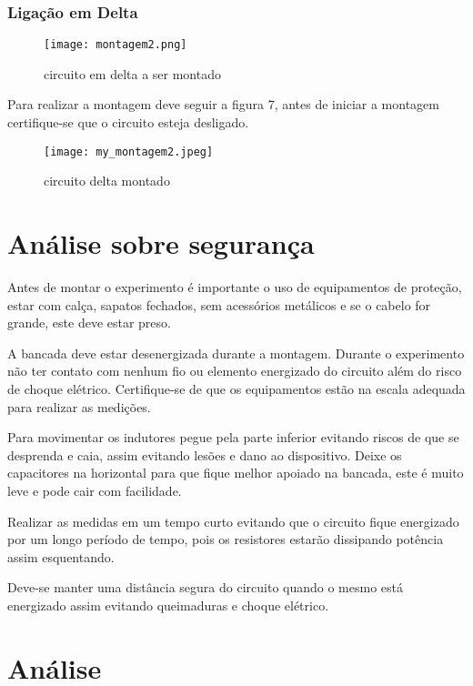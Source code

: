 \documentclass[a4paper, 12pt]{article}
\begin{document}
	\subsubsection{Ligação em Delta}
	\begin{figure}[H]
		\centering %
		\texttt{[image: montagem2.png]}
		\caption{circuito em delta a ser montado}
		\label{figura:montada}
	\end{figure}
	
	Para realizar a montagem deve seguir a figura 7, antes de iniciar a montagem certifique-se que o circuito esteja desligado.
	\begin{figure}[H]
		\centering %
		\texttt{[image: my\_montagem2.jpeg]}
		\caption{circuito delta montado}
	\end{figure}
	
	
	
	\newpage
	\section{Análise sobre segurança}
	\mbox{}
	\justifying
	Antes de montar o experimento é importante o uso de equipamentos de proteção, estar com calça, sapatos fechados, sem acessórios metálicos e se o cabelo for grande, este deve estar preso.
	
	A bancada deve estar desenergizada durante a montagem. Durante o experimento não ter contato com nenhum fio ou elemento energizado do circuito além do risco de choque elétrico. Certifique-se de que os equipamentos estão na escala adequada para realizar as medições.
	
	Para movimentar os indutores pegue pela parte inferior evitando riscos de que se desprenda e caia, assim evitando lesões e dano ao dispositivo. Deixe os capacitores na horizontal para que
	fique melhor apoiado na bancada, este é muito leve e pode cair com facilidade.
	
	Realizar as medidas em um tempo curto evitando que o circuito fique energizado por um longo período de tempo, pois os resistores estarão dissipando potência assim esquentando.
	
	Deve-se manter uma distância segura do circuito quando o mesmo está energizado assim evitando queimaduras e choque elétrico.
	
	
	\newpage
	\section{Análise}
	\justifying
\end{document}
